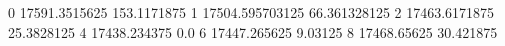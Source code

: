 0 17591.3515625 153.1171875
1 17504.595703125 66.361328125
2 17463.6171875 25.3828125
4 17438.234375 0.0
6 17447.265625 9.03125
8 17468.65625 30.421875
